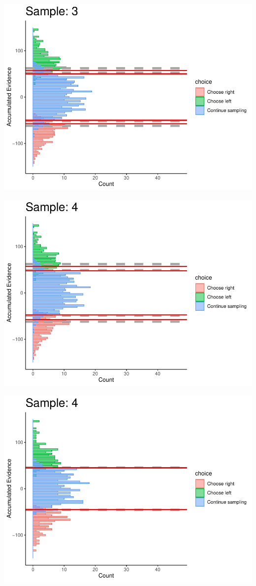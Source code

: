 \documentclass[
]{book}
\begin{document}
\begin{center}\includegraphics[width=0.8\linewidth]{LateNightBayes_files/figure-latex/collapsing_dcb-29} \end{center}

\begin{center}\includegraphics[width=0.8\linewidth]{LateNightBayes_files/figure-latex/collapsing_dcb-30} \end{center}

\begin{center}\includegraphics[width=0.8\linewidth]{LateNightBayes_files/figure-latex/collapsing_dcb-31} \end{center}
\end{document}
